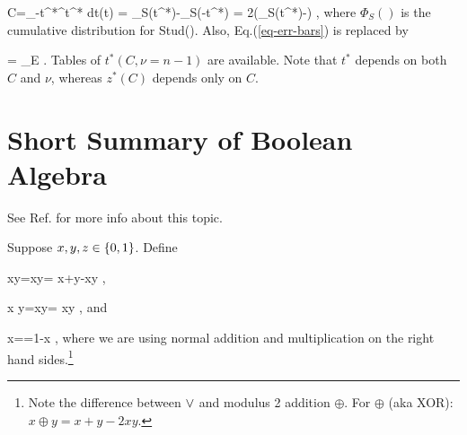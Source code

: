 \beq
C=\int_{-t^*}^{t^*} dt(t) = 
\Phi_S(t^*)-\Phi_S(-t^*)
=
2\left(\Phi_S(t^*)-\right)
\label{eq-conf-level1-stu}
\;,
\eeq
where $\Phi_S()$
is the cumulative
distribution for  Stud().
Also, Eq.(\ref{eq-err-bars})
is replaced  by

\beq
{} =
 \pm 
{}_{E}
\;.
\eeq
Tables of $t^*(C,\nu=n-1)$
are available. Note 
that $t^*$
depends on both $C$ and $\nu$,
whereas $z^*(C)$
depends only on $C$.


\section{Short Summary of 
Boolean Algebra} 
See Ref.\cite{wiki-bool} for more info
about this topic.

Suppose $x, y, z\in \{0,1\}$. Define

\beq
xy=x\V y= x+y-xy
\;,
\eeq

\beq
x y=x\A y= xy
\;,
\eeq
and

\beq
{}x==1-x
\;,
\eeq
where we are using
normal addition and multiplication 
on the right hand sides.\footnote{Note the
difference between $\vee$ and modulus
2 addition $\oplus$. 
For $\oplus$ (aka XOR): $x\oplus y=x+y-2xy$.}




